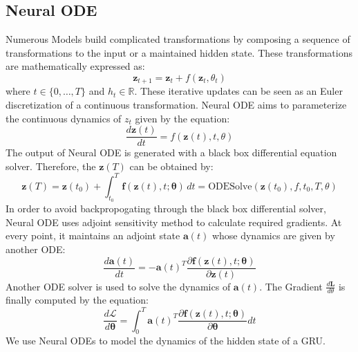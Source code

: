\documentclass[12pt]{article}
\begin{document}
		\subsection{Neural ODE}
			\footnotesize{Numerous Models build complicated transformations by composing a sequence of
			transformations to the input or a maintained hidden state. These transformations are mathematically expressed as:
			\begin{equation*}
				\mathbf{z}_{t+1} = \mathbf{z}_{t} + f(\mathbf{z}_{t}, \theta_{t})
			\end{equation*}
			where $t \in \{0, \dots, T \}$ and $h_{t} \in \mathbb{R}$. These iterative
			updates can be seen as an Euler discretization of a continuous transformation. Neural ODE aims to parameterize the continuous dynamics of $z_{t}$ given by the equation:
			\begin{equation*}
				\frac{d\mathbf{z}(t)}{dt} = f(\mathbf{z}(t), t, \theta) 
			\end{equation*}
			The output of Neural ODE is generated with a black box differential equation solver. Therefore, the $\mathbf{z}(T)$ can be obtained by:
			\begin{equation*}
				\mathbf{z}(T) = \mathbf{z}(t_0) + \int_{t_{0}}^T \mathbf{f}(\mathbf{z}(t), t; \mathbf{\theta}) \, dt = \text{ODESolve}(\mathbf{z}(t_0), f, t_0, T, \theta)
			\end{equation*}
			In order to avoid backpropogating through the black box differential solver, Neural ODE uses adjoint sensitivity method to calculate required gradients. At every point, it maintains an adjoint state $\mathbf{a}(t)$ whose dynamics are given by another ODE:
			\begin{equation*}
				\frac{d\mathbf{a}(t)}{dt} = -\mathbf{a}(t)^T \frac{\partial \mathbf{f}(\mathbf{z}(t), t; \mathbf{\theta})}{\partial \mathbf{z}(t)}
			\end{equation*}
			Another ODE solver is used to solve the dynamics of $\mathbf{a}(t)$.
			The Gradient $\frac{d\mathbf{L}}{d\theta}$ is finally computed by the equation:
			\begin{equation*}
				\frac{d\mathcal{L}}{d\mathbf{\theta}} = \int_0^T \mathbf{a}(t)^T \frac{\partial \mathbf{f}(\mathbf{z}(t), t; \mathbf{\theta})}{\partial \mathbf{\theta}} dt
			\end{equation*}
			We use Neural ODEs to model the dynamics of the hidden state of a GRU.}
\end{document}
